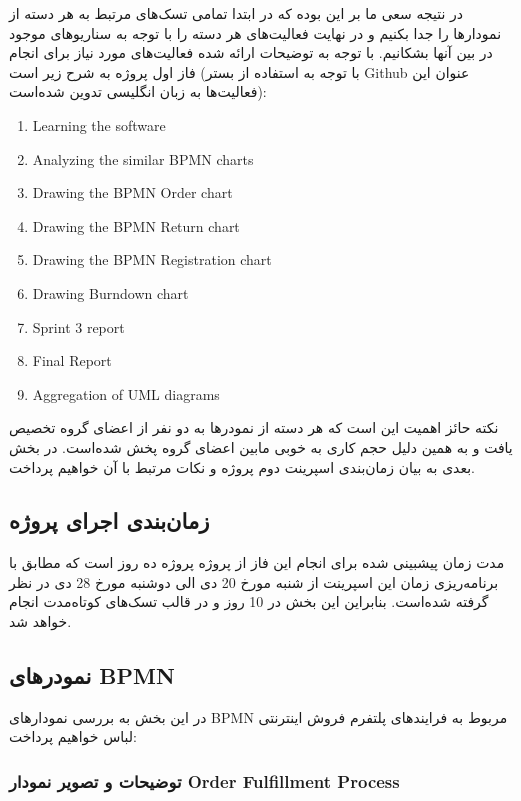 \documentclass[]{article}
\begin{document}
در نتیجه سعی ما بر این بوده که در ابتدا تمامی تسک‌های مرتبط به هر دسته
از نمودارها را جدا بکنیم و در نهایت فعالیت‌های هر دسته را با توجه به
سناریوهای موجود در بین آنها بشکانیم. با توجه به توضیحات ارائه شده
فعالیت‌های مورد نیاز برای انجام فاز اول پروژه به شرح زیر است (با توجه به
استفاده از بستر Github عنوان این فعالیت‌ها به زبان انگلیسی تدوین
شده‌است):

\begin{enumerate}
\def\labelenumi{\arabic{enumi})}
\item
  Learning the software
\item
  Analyzing the similar BPMN charts
\item
  Drawing the BPMN Order chart
\item
  Drawing the BPMN Return chart
\item
  Drawing the BPMN Registration chart
\item
  Drawing Burndown chart
\item
  Sprint 3 report
\item
  Final Report
\item
  Aggregation of UML diagrams
\end{enumerate}

نکته حائز اهمیت این است که هر دسته از نمودرها به دو نفر از اعضای گروه
تخصیص یافت و به همین دلیل حجم کاری به خوبی مابین اعضای گروه پخش شده‌است.
در بخش بعدی به بیان زمان‌بندی اسپرینت دوم پروژه و نکات مرتبط با آن
خواهیم پرداخت.

\subsection{زمان‌بندی اجرای
پروژه}\label{ux632ux645ux627ux646ux628ux646ux62fux6cc-ux627ux62cux631ux627ux6cc-ux67eux631ux648ux698ux647-2}

مدت زمان پیشبینی شده برای انجام این فاز از پروژه پروژه ده روز است که
مطابق با برنامه‌ریزی زمان این اسپرینت از شنبه مورخ 20 دی الی دوشنبه مورخ
28 دی در نظر گرفته شده‌است. بنابراین این بخش در 10 روز و در قالب تسک‌های
کوتاه‌مدت انجام خواهد شد.

\subsection{نمودرهای
BPMN}\label{ux646ux645ux648ux62fux631ux647ux627ux6cc-bpmn}

در این بخش به بررسی نمودارهای BPMN مربوط به فرایندهای پلتفرم فروش
اینترنتی لباس خواهیم پرداخت:

\subsubsection{توضیحات و تصویر نمودار Order Fulfillment
Process}\label{ux62aux648ux636ux6ccux62dux627ux62a-ux648-ux62aux635ux648ux6ccux631-ux646ux645ux648ux62fux627ux631-order-fulfillment-process}
\end{document}
